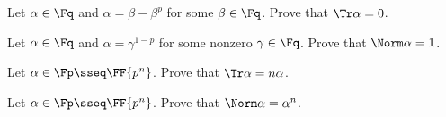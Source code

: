 \documentclass{article}
\begin{document}
\begin{subexercise}
  Let \( \alpha\in\Fq \) and \( \alpha=\beta-\beta^p \) for some \( \beta\in\Fq \).
  Prove that \( \Tr \alpha = 0 \).
\end{subexercise}
\begin{solution}

\end{solution}
\pagebreak

\begin{subexercise}
Let \( \alpha\in\Fq \) and \( \alpha=\gamma^{1-p} \) for some nonzero \( \gamma\in\Fq \).
Prove that \( \Norm \alpha = 1 \).
\end{subexercise}
\begin{solution}

\end{solution}
\pagebreak

\begin{subexercise}
  Let \( \alpha\in\Fp \sseq \FF{p^n} \).
  Prove that \( \Tr \alpha = n\alpha \).
\end{subexercise}
\begin{solution}

\end{solution}
\pagebreak

\begin{subexercise}
  Let \( \alpha\in\Fp \sseq \FF{p^n} \).
  Prove that \( \Norm \alpha = \alpha^n \).
\end{subexercise}
\begin{solution}

\end{solution}
\end{document}

